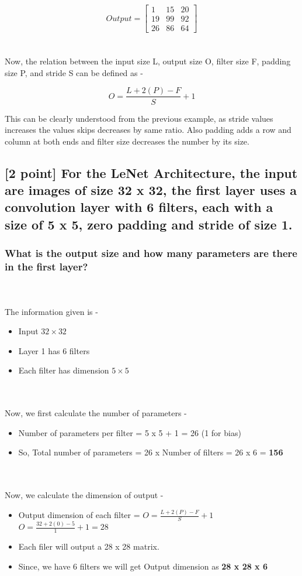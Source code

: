 $$Output =  \begin{bmatrix} 1 & 15 & 20 \\
                 19 & 99 & 92\\
                 26 & 86 & 64\end{bmatrix}$$
\\ \\
Now, the relation between the input size L, output size O, filter size F, padding size P, and stride S can be defined as - 

$$ O = \frac{L + 2(P) - F}{S} + 1$$

This can be clearly understood from the previous example, as stride values increases the values skips decreases by same ratio. Also padding adds a row and column at both ends and filter size decreases the number by its size.  

\subsection{[2 point] For the LeNet Architecture, the input are images of size 32 x 32, the first layer uses a convolution layer with 6 filters, each with a size of 5 x 5, zero padding and stride of size 1.}
\subsubsection{What is the output size and how many parameters are there in the first layer?}
\\ \\ 
The information given is -
\begin{itemize}
    \item Input  $32 \times 32$
    \item Layer 1 has 6 filters
    \item Each filter has dimension $5 \times 5$ 
\end{itemize}
\\ \\ 
Now, we first calculate the number of parameters - 
\begin{itemize}
    \item Number of parameters per filter = 5 x 5 + 1 = 26 (1 for bias)
    \item So, Total number of parameters  = 26 x Number of filters = 26 x 6 = \textbf{156}
\end{itemize}
\\ \\
Now, we calculate the dimension of output - 
\begin{itemize}
    \item Output dimension of each filter = $ O = \frac{L + 2(P) - F}{S} + 1$\\
    $O = \frac{32 + 2(0) - 5}{1} + 1 = 28$ 
    \item Each filer will output a 28 x 28 matrix. 
    \item Since, we have 6 filters we will get Output dimension as \textbf{28 x 28 x 6}
\end{itemize}

